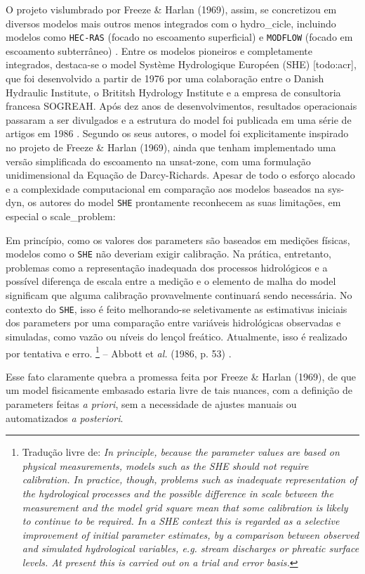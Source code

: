 \documentclass[./main.tex]{subfiles}
\begin{document}
\par O projeto vislumbrado por Freeze \& Harlan (1969), assim, se concretizou em diversos modelos mais outros menos integrados com o \gls{hydro_cicle}, incluindo modelos como \texttt{HEC-RAS} (focado no escoamento superficial) e \texttt{MODFLOW} (focado em escoamento subterrâneo) \cite{Simmons2020a}. Entre os modelos pioneiros e completamente integrados, destaca-se o \gls{model} Système Hydrologique Européen (SHE) [todo:acr], que foi desenvolvido a partir de 1976 por uma colaboração entre o Danish Hydraulic Institute, o Brititsh Hydrology Institute e a empresa de consultoria francesa SOGREAH. Após dez anos de desenvolvimentos, resultados operacionais passaram a ser divulgados e a estrutura do \gls{model} foi publicada em uma série de artigos em 1986 \cite{Abbott1986a, Abbott1986b}. Segundo os seus autores, o \gls{model} foi explicitamente inspirado no projeto de Freeze \& Harlan (1969), ainda que tenham implementado uma versão simplificada do escoamento na \gls{unsat-zone}, com uma formulação unidimensional da Equação de Darcy-Richards. Apesar de todo o esforço alocado e a complexidade computacional em comparação aos modelos baseados na \gls{sys-dyn}, os autores do \gls{model} \texttt{SHE} prontamente reconhecem as suas limitações, em especial o \gls{scale_problem}:
\begin{adjustwidth}{100pt}{0pt}
\medskip
\small
Em princípio, como os valores dos \gls{parameters} são baseados em medições físicas, modelos como o \texttt{SHE} não deveriam exigir calibração. Na prática, entretanto, problemas como a representação inadequada dos processos hidrológicos e a possível diferença de escala entre a medição e o elemento de malha do \gls{model} significam que alguma calibração provavelmente continuará sendo necessária. No contexto do \texttt{SHE}, isso é feito melhorando-se seletivamente as estimativas iniciais dos \gls{parameters} por uma comparação entre variáveis hidrológicas observadas e simuladas, como vazão ou níveis do lençol freático. Atualmente, isso é realizado por tentativa e erro.
\footnote{Tradução livre de: 
\textit{
In principle, because the parameter values are based on physical measurements, models such as the SHE should not require calibration. In practice, though, problems such as inadequate representation of the hydrological processes and the possible difference in scale between the measurement and the model grid square mean that some calibration is likely to continue to be required. In a SHE context this is regarded as a selective improvement of initial parameter estimates, by a comparison between observed and simulated hydrological variables, e.g. stream discharges or phreatic surface levels. At present this is carried out on a trial and error basis. 
}} -- Abbott et \textit{al.} (1986, p. 53) \cite{Abbott1986a}.
\medskip
\end{adjustwidth}
\noindent Esse fato claramente quebra a promessa feita por Freeze \& Harlan (1969), de que um \gls{model} fisicamente embasado estaria livre de tais nuances, com a definição de \gls{parameters} feitas \textit{a priori}, sem a necessidade de ajustes manuais ou automatizados \textit{a posteriori}. 
\end{document}

